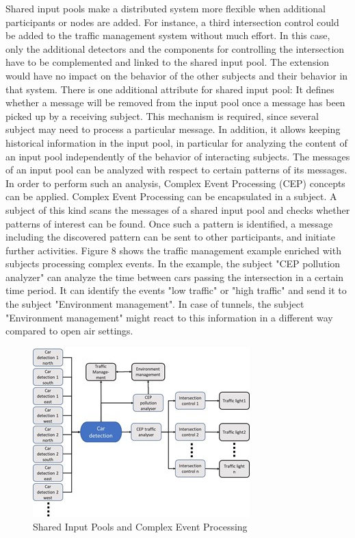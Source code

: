 Shared input pools make a distributed system more flexible when additional participants or nodes are added. For instance, a third intersection control could be added to the traffic management system without much effort. In this case, only the additional detectors and the components for controlling the intersection have to be complemented and linked to the shared input pool. The extension would have no impact on the behavior of the other subjects and their behavior in that system.
There is one additional attribute for shared input pool: It defines whether a message will be removed from the input pool once a message has been picked up by a receiving subject. This mechanism is required, since several subject may need to process a particular message. In addition, it allows keeping historical information in the input pool, in particular for analyzing the content of an input pool independently of the behavior of interacting subjects. 
The messages of an input pool can be analyzed with respect to certain patterns of its messages. In order to perform such an analysis, Complex Event Processing (CEP) concepts can be applied. Complex Event Processing can be encapsulated in a subject. A subject of this kind scans the messages of a shared input pool and checks whether patterns of interest can be found. Once such a pattern is identified, a message including the discovered pattern can be sent to other participants, and initiate further activities. Figure 8 shows the traffic management example enriched with subjects processing complex events.
In the example, the subject "CEP pollution analyzer" can analyze the time between cars passing the intersection in a certain time period. It can identify the events "low traffic" or "high traffic" and send it to the subject "Environment management". In case of tunnels, the subject "Environment management" might react to this information in a different way compared to open air settings. 


\begin{figure}[htbp]
	\centering
	\includegraphics[width=0.7\linewidth]{Figures/Chapter5/figuresshared/SharedInputPoolEvent.jpg}
	\caption[Shared Input Pools and Complex Event Processing]{Shared Input Pools and Complex Event Processing}
	\label{fig:sharedInputPoolEvents}
\end{figure}

